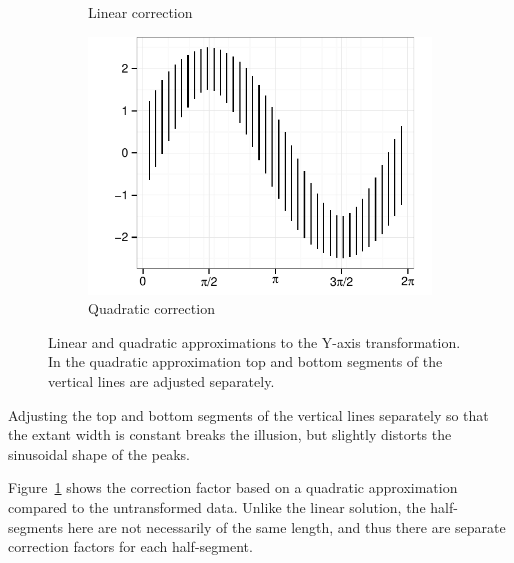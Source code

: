 \documentclass[11pt]{isuthesis}\usepackage[]{graphicx}\usepackage[]{color}
\newenvironment{knitrout}{}{} %
\begin{document}
\begin{figure}
\begin{subfigure}[b]{.32\linewidth}
\begin{knitrout}
{}



\end{knitrout}
\caption{Linear correction}
\end{subfigure}
\begin{subfigure}[b]{.32\linewidth}\centering
\begin{knitrout}
\color{fgcolor}

{\centering \includegraphics[width=\linewidth]{Figure/sineIllusion/fig-CtsAdjustedResults-1} 

}



\end{knitrout}
\caption{Quadratic correction}
\end{subfigure}
\caption[Linear and quadratic approximations to the Y-axis transformation]{Linear and quadratic approximations to the Y-axis transformation. 
In the quadratic approximation top and bottom segments of the vertical lines are adjusted separately.}
\label{fig:GeneralQuadraticCorrection} 
\end{figure}

Adjusting the top and bottom segments of the vertical lines separately so that the extant width is constant breaks the illusion, but slightly distorts the sinusoidal shape of the peaks.

Figure~\ref{fig:GeneralQuadraticCorrection} shows the correction factor based on a quadratic approximation compared to the untransformed data. 
Unlike the linear solution, the half-segments here are not necessarily of the same length, and thus there are separate correction factors for each half-segment. 
\end{document}
